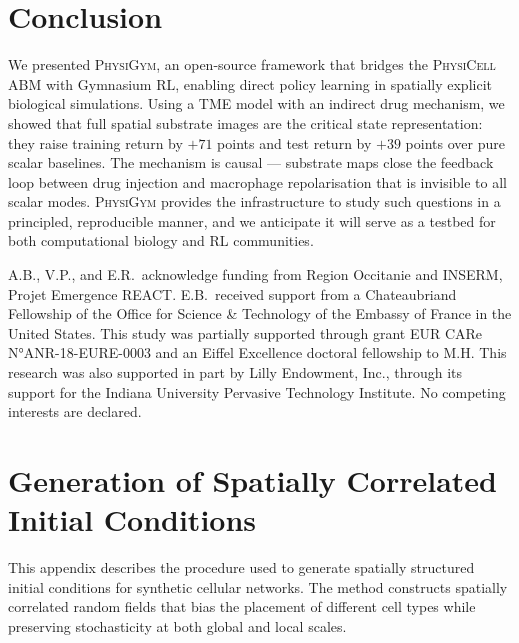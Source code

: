 \documentclass{article}
\newcommand{\physigym}{\textsc{PhysiGym}}
\newcommand{\physicell}{\textsc{PhysiCell}}
\begin{document}
\section{Conclusion}

We presented \physigym{}, an open-source framework that bridges the
\physicell{} ABM with Gymnasium RL, enabling direct policy learning in
spatially explicit biological simulations.
Using a TME model with an indirect drug mechanism, we showed that full
spatial substrate images are the critical state representation: they raise
training return by $+71$ points and test return by $+39$ points over pure
scalar baselines.
The mechanism is causal — substrate maps close the feedback loop between drug
injection and macrophage repolarisation that is invisible to all scalar modes.
\physigym{} provides the infrastructure to study such questions in a
principled, reproducible manner, and we anticipate it will serve as a
testbed for both computational biology and RL communities.

\begin{ack}
A.B., V.P., and E.R.\ acknowledge funding from Region Occitanie and INSERM,
Projet Emergence REACT.
E.B.\ received support from a Chateaubriand Fellowship of the Office for
Science \& Technology of the Embassy of France in the United States.
This study was partially supported through grant EUR CARe N°ANR-18-EURE-0003
and an Eiffel Excellence doctoral fellowship to M.H.
This research was also supported in part by Lilly Endowment, Inc., through its
support for the Indiana University Pervasive Technology Institute.
No competing interests are declared.
\end{ack}




\appendix

\section{Generation of Spatially Correlated Initial Conditions}
\label{app:ic}

This appendix describes the procedure used to generate spatially structured
initial conditions for synthetic cellular networks. The method constructs
spatially correlated random fields that bias the placement of different cell
types while preserving stochasticity at both global and local scales.
\end{document}
